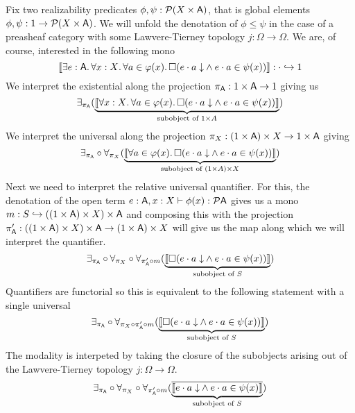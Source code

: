 \documentclass[11pt]{article}
\begin{document}
Fix two realizability predicates \(\phi,\psi : \mathcal{P}{({X}\times{\ensuremath{\mathsf{A}}})}\), that is global
elements \(\phi,\psi : 1 \to \mathcal{P}{({X}\times{\ensuremath{\mathsf{A}}})}\).
%
We will unfold the denotation of \(\phi \leq \psi\) in the case of a preasheaf
category with some Lawvere-Tierney topology \(j : \Omega \to \Omega\).
%
We are, of course, interested in the following mono
%
\[
  \llbracket
    \IExists{e : \A}{
      \IForall{x : \X}{
        \IForall{a \in \varphi(x)}{
          \IBox{(
            \IAnd%
            {\ITotal{\IAp{e}{a}}}%
            {\IAp{e}{a} \in \psi(x)}
          )}
        }
      }
    }
  \rrbracket : \cdot \hookrightarrow 1
\]
%
We interpret the existential along the projection \(\pi_{\mathsf{A}} : 1 \times \mathsf{A} \to 1\)
giving us
%
\[
  \exists_{\pi_{\A}}(\underbrace{\llbracket
    \IForall{x : \X}{
      \IForall{a \in \varphi(x)}{
        \IBox{(
          \IAnd%
          {\ITotal{\IAp{e}{a}}}%
          {\IAp{e}{a} \in \psi(x)}
        )}
      }
    }
  \rrbracket}_{\text{subobject of }1 \times A})
\]
%
We interpret the universal along the projection
\(\pi_{X} : (1 \times \mathsf{A}) \times X \to 1 \times \mathsf{A}\) giving
%
\[
  \exists_{\pi_{\A}}\circ\forall_{\pi_{\X}}(\underbrace{\llbracket
    \IForall{a \in \varphi(x)}{
      \IBox{(
        \IAnd%
        {\ITotal{\IAp{e}{a}}}%
        {\IAp{e}{a} \in \psi(x)}
      )}
    }
  \rrbracket}_{\text{subobject of }(1 \times A) \times \X})
\]
%
Next we need to interpret the relative universal quantifier.
%
For this, the denotation of the open term
\(e : \mathsf{A}, x : X \vdash \phi(x) : \mathcal{P}{\mathsf{A}}\) gives us a mono
%
\(
  m :
  S \hookrightarrow ((1 \times \mathsf{A}) \times X) \times \mathsf{A}
\)
%
and composing this with the projection
\(\pi'_{\mathsf{A}} : ((1 \times \mathsf{A}) \times X) \times \mathsf{A} \to (1 \times \mathsf{A}) \times X\)
will give us the map along which we will interpret the quantifier.
%
\[
  \exists_{\pi_{\A}}\circ
  \forall_{\pi_{\X}}\circ
  \forall_{\pi'_{\A}\circ m}(\underbrace{\llbracket
    \IBox{(
      \IAnd%
      {\ITotal{\IAp{e}{a}}}%
      {\IAp{e}{a} \in \psi(x)}
    )}
  \rrbracket}_{\text{subobject of } S})
\]
%
Quantifiers are functorial so this is equivalent to the following
statement with a single universal
%
\[
  \exists_{\pi_{\A}}\circ
  \forall_{\pi_{\X}\circ\pi'_{\A}\circ m}(\underbrace{\llbracket
    \IBox{(
      \IAnd%
      {\ITotal{\IAp{e}{a}}}%
      {\IAp{e}{a} \in \psi(x)}
    )}
  \rrbracket}_{\text{subobject of } S})
\]
%
The modality is interpeted by taking the closure of the subobjects arising
out of the Lawvere-Tierney topology \(j:\Omega\to\Omega\).
%
\[
  \exists_{\pi_{\A}}\circ
  \forall_{\pi_{\X}}\circ
  \forall_{\pi'_{\A}\circ m}
  (\overline{\underbrace{\llbracket
      \IAnd%
      {\ITotal{\IAp{e}{a}}}%
      {\IAp{e}{a} \in \psi(x)}
  \rrbracket}_{\text{subobject of } S}})
\]
\end{document}
